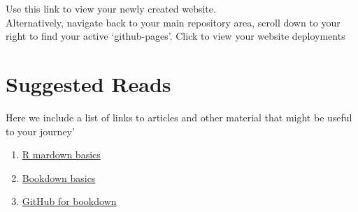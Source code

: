 \documentclass[
]{book}
\providecommand{\tightlist}{%
  \setlength{\itemsep}{0pt}\setlength{\parskip}{0pt}}
\begin{document}
Use this link to view your newly created website.\\
Alternatively, navigate back to your main repository area, scroll down to your right to find your active `github-pages'. Click to view your website deployments

\hypertarget{suggested-reads}{%
\chapter{Suggested Reads}\label{suggested-reads}}

Here we include a list of links to articles and other material that might be useful to your journey'

\begin{enumerate}
\def\labelenumi{\arabic{enumi}.}
\tightlist
\item
  \href{https://bookdown.org/yihui/rmarkdown/}{R mardown basics}
\item
  \href{https://bookdown.org/yihui/bookdown/}{Bookdown basics}
\item
  \href{https://bookdown.org/yihui/bookdown/github.html}{GitHub for bookdown}
\end{enumerate}

  
\end{document}
